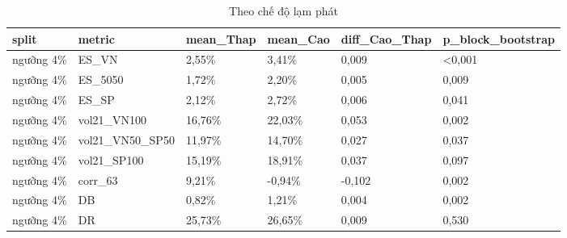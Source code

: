 \begin{table}
\caption{Theo chế độ lạm phát}
\label{tab:T10_inflation_regimes}
\begin{tabular}{llllll}
\toprule
split & metric & mean\_Thap & mean\_Cao & diff\_Cao\_Thap & p\_block\_bootstrap \\
\midrule
ngưỡng 4\% & ES\_VN & 2,55\% & 3,41\% & 0,009 & <0,001 \\
ngưỡng 4\% & ES\_5050 & 1,72\% & 2,20\% & 0,005 & 0,009 \\
ngưỡng 4\% & ES\_SP & 2,12\% & 2,72\% & 0,006 & 0,041 \\
ngưỡng 4\% & vol21\_VN100 & 16,76\% & 22,03\% & 0,053 & 0,002 \\
ngưỡng 4\% & vol21\_VN50\_SP50 & 11,97\% & 14,70\% & 0,027 & 0,037 \\
ngưỡng 4\% & vol21\_SP100 & 15,19\% & 18,91\% & 0,037 & 0,097 \\
ngưỡng 4\% & corr\_63 & 9,21\% & -0,94\% & -0,102 & 0,002 \\
ngưỡng 4\% & DB & 0,82\% & 1,21\% & 0,004 & 0,002 \\
ngưỡng 4\% & DR & 25,73\% & 26,65\% & 0,009 & 0,530 \\
\bottomrule
\end{tabular}
\end{table}
